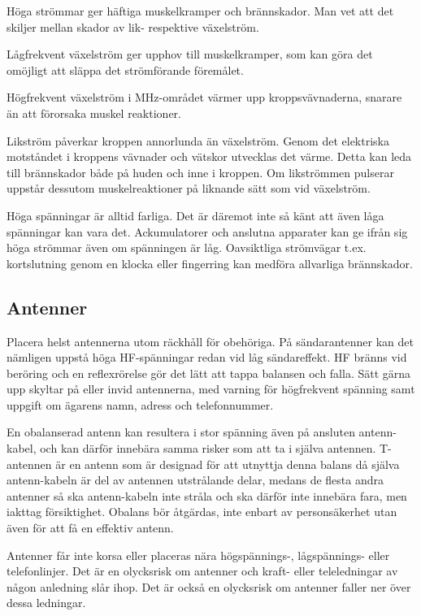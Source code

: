 Höga strömmar ger häftiga muskelkramper och brännskador. Man vet att
det skiljer mellan skador av lik- respektive växelström.

Lågfrekvent växelström ger upphov till muskelkramper, som kan göra det
omöjligt att släppa det strömförande föremålet.

Högfrekvent växelström i MHz-området värmer upp kroppsvävnaderna,
snarare än att förorsaka muskel reaktioner.

Likström påverkar kroppen annorlunda än växelström. Genom det
elektriska motståndet i kroppens vävnader och vätskor utvecklas det
värme. Detta kan leda till brännskador både på huden och inne i
kroppen.  Om likströmmen pulserar uppstår dessutom muskelreaktioner på
liknande sätt som vid växelström.

Höga spänningar är alltid farliga. Det är däremot inte så känt att
även låga spänningar kan vara det. Ackumulatorer och anslutna
apparater kan ge ifrån sig höga strömmar även om spänningen är
låg. Oavsiktliga strömvägar t.ex. kortslutning genom en klocka eller
fingerring kan medföra allvarliga brännskador.

\subsection{Antenner}

Placera helst antennerna utom räckhåll för obehöriga. På
sändarantenner kan det nämligen uppstå höga HF-spänningar redan vid
låg sändareffekt. HF bränns vid beröring och en reflexrörelse gör det
lätt att tappa balansen och falla. Sätt gärna upp skyltar på eller
invid antennerna, med varning för högfrekvent spänning samt uppgift om
ägarens namn, adress och telefonnummer.

En obalanserad antenn kan resultera i stor spänning även på ansluten
antenn-kabel, och kan därför innebära samma risker som att ta i själva
antennen. T-antennen är en antenn som är designad för att utnyttja denna
balans då själva antenn-kabeln är del av antennen utstrålande delar,
medans de flesta andra antenner så ska antenn-kabeln inte stråla och
ska därför inte innebära fara, men iakttag försiktighet. Obalans bör
åtgärdas, inte enbart av personsäkerhet utan även för att få en effektiv
antenn.

Antenner får inte korsa eller placeras nära högspännings-,
lågspännings- eller telefonlinjer. Det är en olycksrisk om antenner
och kraft- eller teleledningar av någon anledning slår ihop. Det är
också en olycksrisk om antenner faller ner över dessa ledningar.

